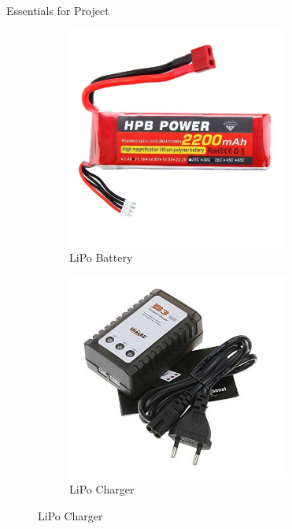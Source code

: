 \documentclass[12pt, oneside]{report}
\numberwithin{equation}{section}
\begin{document}
\begin{chapter}{Essentials for Project}
\begin{figure}[h]
\center
\begin{subfigure}[hb]{0.3\textwidth}
\includegraphics[width=0.8\textwidth]{battery}
\caption{LiPo Battery}
\end{subfigure}
\begin{subfigure}[hb]{0.3\textwidth}
\includegraphics[width=0.8\textwidth]{charger}
\caption{LiPo Charger}
\end{subfigure}
\end{figure}



\end{chapter}
\end{document}
